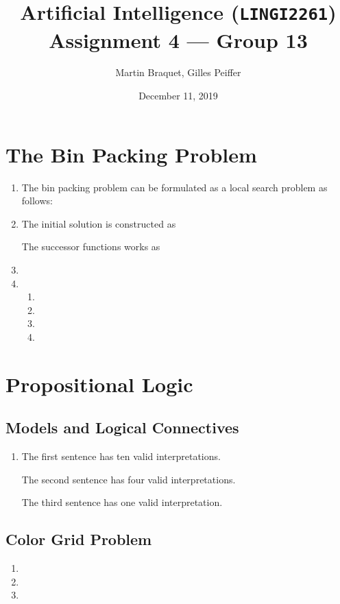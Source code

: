 \documentclass[journal,onecolumn]{IEEEtran}
\title{Artificial Intelligence (\texttt{LINGI2261}) \\ Assignment 4 --- Group 13}
\author{Martin Braquet, Gilles Peiffer}
\date{December 11, 2019}
\begin{document}
\maketitle

\section{The Bin Packing Problem}
\begin{enumerate}
	\item The bin packing problem can be formulated as a local search problem as follows: %
	\item The initial solution is constructed as %
	
	
	The successor functions works as %
	\item %
	\item \begin{enumerate}
		\item %
		\item %
		\item %
		\item %
	\end{enumerate}
\end{enumerate}

\section{Propositional Logic}
\subsection{Models and Logical Connectives}
\begin{enumerate}
	\item The first sentence has ten valid interpretations.
	
	
	The second sentence has four valid interpretations.
	
	
	The third sentence has one valid interpretation.
\end{enumerate}

\subsection{Color Grid Problem}
\begin{enumerate}
	\item %
	\item %
	\item %
\end{enumerate}
\end{document}

